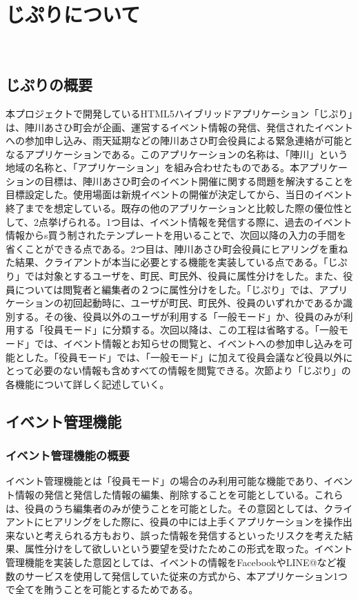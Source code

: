 \chapter{じぷりについて}
​
\section{じぷりの概要}%
本プロジェクトで開発しているHTML5ハイブリッドアプリケーション「じぷり」は、陣川あさひ町会が企画、運営するイベント情報の発信、発信されたイベントへの参加申し込み、雨天延期などの陣川あさひ町会役員による緊急連絡が可能となるアプリケーションである。このアプリケーションの名称は、「陣川」という地域の名称と、「アプリケーション」を組み合わせたものである。本アプリケーションの目標は、陣川あさひ町会のイベント開催に関する問題を解決することを目標設定した。使用場面は新規イベントの開催が決定してから、当日のイベント終了までを想定している。既存の他のアプリケーションと比較した際の優位性として、2点挙げられる。1つ目は、イベント情報を発信する際に、過去のイベント情報からs買う制されたテンプレートを用いることで、次回以降の入力の手間を省くことができる点である。2つ目は、陣川あさひ町会役員にヒアリングを重ねた結果、クライアントが本当に必要とする機能を実装している点である。「じぷり」では対象とするユーザを、町民、町民外、役員に属性分けをした。また、役員については閲覧者と編集者の２つに属性分けをした。「じぷり」では、アプリケーションの初回起動時に、ユーザが町民、町民外、役員のいずれかであるか識別する。その後、役員以外のユーザが利用する「一般モード」か、役員のみが利用する「役員モード」に分類する。次回以降は、この工程は省略する。「一般モード」では、イベント情報とお知らせの閲覧と、イベントへの参加申し込みを可能とした。「役員モード」では、「一般モード」に加えて役員会議など役員以外にとって必要のない情報も含めすべての情報を閲覧できる。次節より「じぷり」の各機能について詳しく記述していく。
​
\section{イベント管理機能}%
\subsection{イベント管理機能の概要}%
イベント管理機能とは「役員モード」の場合のみ利用可能な機能であり、イベント情報の発信と発信した情報の編集、削除することを可能としている。これらは、役員のうち編集者のみが使うことを可能とした。その意図としては、クライアントにヒアリングをした際に、役員の中には上手くアプリケーションを操作出来ないと考えられる方もおり、誤った情報を発信するといったリスクを考えた結果、属性分けをして欲しいという要望を受けたためこの形式を取った。イベント管理機能を実装した意図としては、イベントの情報をFacebookやLINE@など複数のサービスを使用して発信していた従来の方式から、本アプリケーション1つで全てを賄うことを可能とするためである。
​
